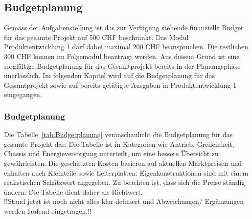 \documentclass[main.tex]{subfiles} %
\begin{document}

\subsection{Budgetplanung}

Gemäss der Aufgabenstellung ist das zur Verfügung stehende finanzielle Budget 
für das gesamte Projekt
auf 500 CHF beschränkt. Das Modul Produktentwicklung 1 darf dabei maximal 200 CHF
beanspruchen. Die restlichen 300 CHF können im Folgemodul beantragt werden. Aus
diesem Grund ist eine sorgfältige Budgetplanung für das Gesamtprojekt bereits in
der Planungsphase unerlässlich. Im folgenden Kapitel wird auf die Budgetplanung
für das Gesamtprojekt sowie auf bereits getätigte Ausgaben in
Produktentwicklung 1 eingegangen.

\subsubsection*{Budgetplanung}
Die Tabelle~\ref{tab:Budgetplanung} veranschaulicht die Budgetplanung für das 
gesamte Projekt dar. Die Tabelle ist in Kategorien wie Antrieb, Greifeinheit, 
Chassis und Energieversorgung unterteilt, um eine bessere Übersicht zu gewährleisten. 
Die geschätzten Kosten basieren auf aktuellen Marktpreisen und enhalten auch 
Kleinteile sowie Leiterplatten. Eigenkonstruktionen sind mit einem realistischen 
Schätzwert angegeben. Zu beachten ist, dass sich die Preise ständig ändern. Die 
Tabelle dient daher als Richtwert.\\

!!Stand jetzt ist noch nicht alles klar definiert und Abweichungen/ Ergänzungen werden laufend eingetragen.!!

\newpage
\end{document}
